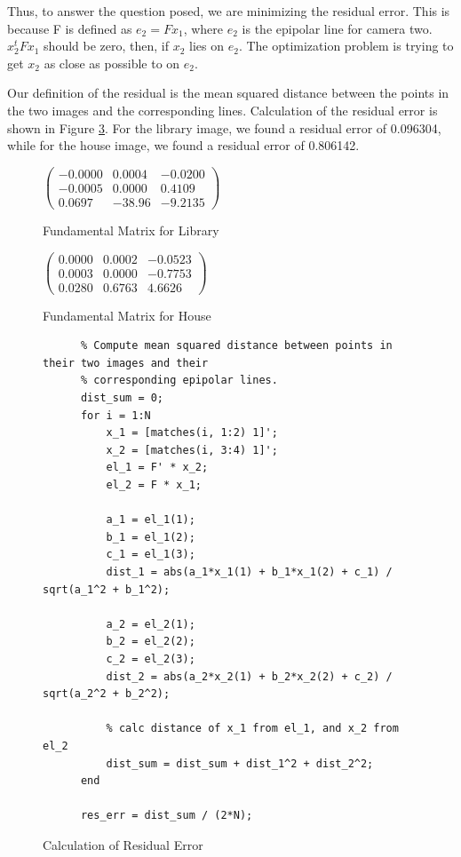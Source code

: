 \documentclass[11pt]{article}
\begin{document}
Thus, to answer the question posed, we are minimizing the residual error.
This is because F is defined as $e_2 = Fx_1$, where $e_2$ is the epipolar line
for camera two.  $x_2^tFx_1$ should be zero, then, if $x_2$ lies on $e_2$. The
optimization problem is trying to get $x_2$ as close as possible to on $e_2$.

Our definition of the residual is the mean squared distance between the points
in the two images and the corresponding lines. Calculation of the residual
error is shown in Figure \ref{residual_code}. For the library image,
we found a residual error of 0.096304, while for the house image, we found
a residual error of 0.806142.

\begin{figure}[h!]
  \caption{Fundamental Matrix for Library}
  \label{f_lib}
  \centering
    $\begin{pmatrix}
      -0.0000&0.0004&-0.0200\\
      -0.0005&0.0000&0.4109\\
      0.0697&-38.96&-9.2135
    \end{pmatrix}$
\end{figure}
\begin{figure}[h!]
  \caption{Fundamental Matrix for House}
  \label{f_house}
  \centering
    $\begin{pmatrix}
      0.0000&0.0002&-0.0523\\
      0.0003&0.0000&-0.7753\\
      0.0280&0.6763& 4.6626
    \end{pmatrix}$
\end{figure}

\begin{figure}[h!]
  \caption{Calculation of Residual Error}
  \label{residual_code}
  \centering
    \begin{lstlisting}
      % Compute mean squared distance between points in their two images and their
      % corresponding epipolar lines.
      dist_sum = 0;
      for i = 1:N
          x_1 = [matches(i, 1:2) 1]';
          x_2 = [matches(i, 3:4) 1]';
          el_1 = F' * x_2;
          el_2 = F * x_1;
          
          a_1 = el_1(1);
          b_1 = el_1(2);
          c_1 = el_1(3);
          dist_1 = abs(a_1*x_1(1) + b_1*x_1(2) + c_1) / sqrt(a_1^2 + b_1^2);

          a_2 = el_2(1);
          b_2 = el_2(2);
          c_2 = el_2(3);
          dist_2 = abs(a_2*x_2(1) + b_2*x_2(2) + c_2) / sqrt(a_2^2 + b_2^2);

          % calc distance of x_1 from el_1, and x_2 from el_2
          dist_sum = dist_sum + dist_1^2 + dist_2^2;
      end

      res_err = dist_sum / (2*N);
    \end{lstlisting}
\end{figure}
\end{document}
